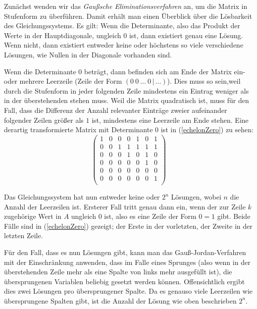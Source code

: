 \documentclass{scrartcl}
\begin{document}
Zunächst wenden wir das \emph{Gaußsche Eliminationsverfahren} an, um die
Matrix in Stufenform zu überführen. Damit erhält man einen Überblick über die
Lösbarkeit des Gleichungssystems. Es gilt: Wenn die Determinante, also das
Produkt der Werte in der Hauptdiagonale, ungleich $0$ ist, dann existiert genau
eine Lösung. Wenn nicht, dann existiert entweder keine oder höchstens so viele
verschiedene Lösungen, wie Nullen in der Diagonale vorhanden sind.

Wenn die Determinante $0$ beträgt, dann befinden sich am Ende der Matrix ein-
oder mehrere Leerzeile (Zeile der Form $(0\ 0\ \dots\ 0\,|\,\dots)$). Dies muss
so sein,weil durch die Stufenform in jeder folgenden Zeile mindestens ein
Eintrag weniger als in der überstehenden stehen muss. Weil die Matrix
quadratisch ist, muss für den Fall, dass die Differenz der Anzahl relevanter
Einträge zweier aufeinander folgender Zeilen größer als $1$ ist, mindestens eine
Leerzeile am Ende stehen. Eine derartig transformierte Matrix mit Determinante
$0$ ist in (\ref{echelonZero}) zu sehen:
\begin{equation}
\left(\begin{array}{cccccc|c}
  1&0&0&0&1&0&1\\
  0&0&1&1&1&1&1\\
  0&0&0&1&0&1&0\\
  0&0&0&0&0&1&0\\
  0&0&0&0&0&0&0\\
  0&0&0&0&0&0&1\\
\end{array}\right)\label{echelonZero}
\end{equation}

Das Gleichungssystem hat nun entweder keine oder $2^n$ Lösungen, wobei $n$ die
Anzahl der Leerzeilen ist. Ersterer Fall tritt genau dann ein, wenn der zur
Zeile $k$ zugehörige Wert in $A$ ungleich $0$ ist, also es eine Zeile der Form
$0=1$ gibt. Beide Fälle sind in (\ref{echelonZero}) gezeigt; der Erste in der
vorletzten, der Zweite in der letzten Zeile.

Für den Fall, dass es nun Lösungen gibt, kann man das Gauß-Jordan-Verfahren mit
der Einschränkung anwenden, dass im Falle eines Sprunges (also wenn in der
überstehenden Zeile mehr als eine Spalte von links mehr ausgefüllt ist), die
übersprungenen Variablen beliebig gesetzt werden können. Offensichtlich ergibt
dies zwei Lösungen pro übersprungener Spalte. Da es genauso viele Leerzeilen wie
übersprungene Spalten gibt, ist die Anzahl der Lösung wie oben beschrieben
$2^n$.
\end{document}
